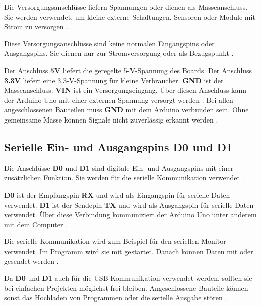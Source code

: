 Die Versorgungsanschlüsse liefern Spannungen oder dienen als Masseanschluss. Sie werden verwendet, um kleine externe Schaltungen, Sensoren oder Module mit Strom zu versorgen \cite{arduino:uno-datasheet}.

Diese Versorgungsanschlüsse sind keine normalen Eingangspins oder Ausgangspins. Sie dienen nur zur Stromversorgung oder als Bezugspunkt \cite{arduino:uno-components}.


Der Anschluss \textbf{5V} liefert die geregelte 5-V-Spannung des Boards. Der Anschluss \textbf{3.3V} liefert eine 3,3-V-Spannung für kleine Verbraucher. \textbf{GND} ist der Masseanschluss. \textbf{VIN} ist ein Versorgungseingang. Über diesen Anschluss kann der Arduino Uno mit einer externen Spannung versorgt werden \cite{arduino:uno-datasheet}.
Bei allen angeschlossenen Bauteilen muss \textbf{GND} mit dem Arduino verbunden sein. Ohne gemeinsame Masse können Signale nicht zuverlässig erkannt werden \cite{arduino:uno-components}.


\subsection{Serielle Ein- und Ausgangspins D0 und D1}



Die Anschlüsse \textbf{D0} und \textbf{D1} sind digitale Ein- und Ausgangspins mit einer zusätzlichen Funktion. Sie werden für die serielle Kommunikation verwendet \cite{arduino:uno-datasheet}.

\textbf{D0} ist der Empfangspin \textbf{RX} und wird als Eingangspin für serielle Daten verwendet. \textbf{D1} ist der Sendepin \textbf{TX} und wird als Ausgangspin für serielle Daten verwendet. Über diese Verbindung kommuniziert der Arduino Uno unter anderem mit dem Computer \cite{arduino:uno-datasheet}\cite{arduino:language-reference}.


Die serielle Kommunikation wird zum Beispiel für den seriellen Monitor verwendet. Im Programm wird sie mit  gestartet. Danach können Daten mit  oder  gesendet werden \cite{arduino:language-reference}.

Da \textbf{D0} und \textbf{D1} auch für die USB-Kommunikation verwendet werden, sollten sie bei einfachen Projekten möglichst frei bleiben. Angeschlossene Bauteile können sonst das Hochladen von Programmen oder die serielle Ausgabe stören \cite{arduino:uno-components}.



